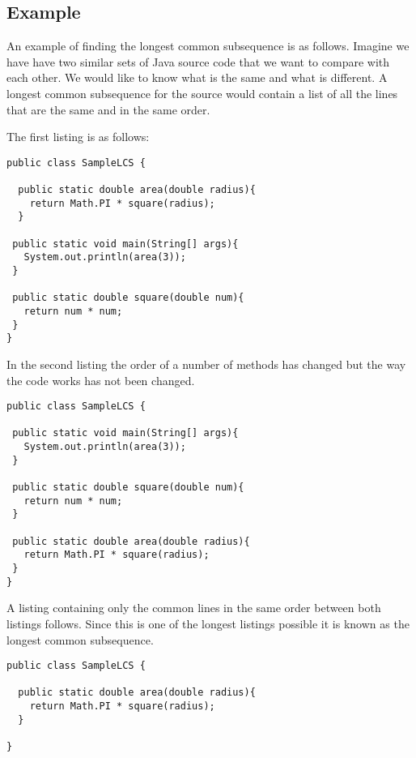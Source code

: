 \subsection{Example}
An example of finding the longest common subsequence is as follows.
Imagine we have have two similar sets of Java source code that we want to compare with each other.  
We would like to know what is the same and what is different.
A longest common subsequence for the source would contain a list of all the lines that are the same and in the same order.

The first listing is as follows:

\begin{lstlisting}
public class SampleLCS { 

  public static double area(double radius){
    return Math.PI * square(radius);
  }
  
 public static void main(String[] args){
   System.out.println(area(3));
 }
 
 public static double square(double num){
   return num * num;
 }
}
\end{lstlisting}

In the second listing the order of a number of methods has changed but the way the code works has not been changed.

\begin{lstlisting}
public class SampleLCS {

 public static void main(String[] args){
   System.out.println(area(3));
 }
 
 public static double square(double num){
   return num * num;
 }
 
 public static double area(double radius){
   return Math.PI * square(radius);
 }
}
\end{lstlisting}

A listing containing only the common lines in the same order between both listings follows.  Since this is one of the longest listings possible it is known as the longest common subsequence.  

\begin{lstlisting}
public class SampleLCS { 

  public static double area(double radius){
    return Math.PI * square(radius);
  }
  
}
\end{lstlisting}

